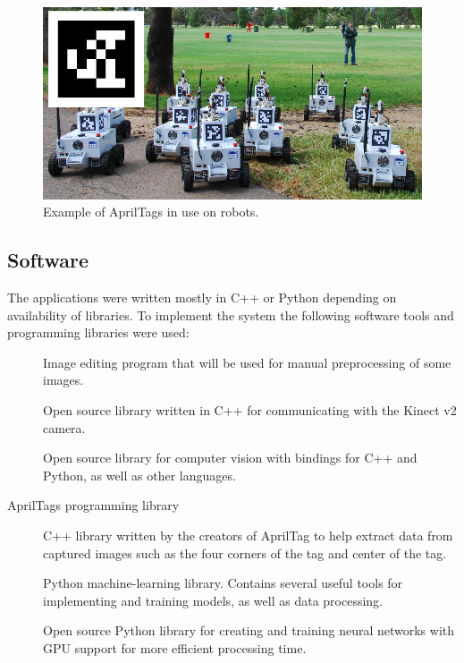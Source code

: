 \begin{figure}
	\centering
	\includegraphics[width=\textwidth]{img/methods/apriltagrobots_overlay.jpg}
	\caption{Example of AprilTags in use on robots.}
\end{figure}

\subsection*{Software}

The applications were written mostly in C++ or Python depending on availability of libraries. To implement the system the following software tools and programming libraries were used:

\begin{description}
	\item[\textcite{GIMP}] Image editing program that will be used for manual preprocessing of some images.

	\item[\textcite{libfreenect2}] Open source library written in C++ for communicating with the Kinect v2 camera.

	\item[\textcite{OpenCV}] Open source library for computer vision with bindings for C++ and Python, as well as other languages.

	\item[AprilTags programming library] C++ library written by the creators of AprilTag to help extract data from captured images such as the four corners of the tag and center of the tag.

	\item[\textcite{scikitlearn}] Python machine-learning library. Contains several useful tools for implementing and training models, as well as data processing.

	\item[\textcite{Tensorflow}] Open source Python library for creating and training neural networks with GPU support for more efficient processing time.

\end{description}


